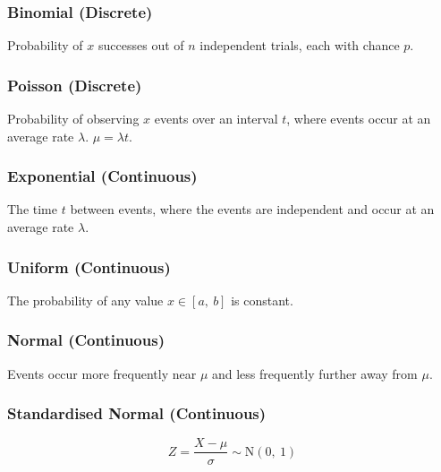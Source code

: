 \documentclass{article}
\begin{document}
\begin{minipage}{62.39259259mm}
    \subsubsection*{Binomial (Discrete)}
    Probability of $x$ successes out of $n$ independent trials, each with chance $p$.
    \subsubsection*{Poisson (Discrete)}
    Probability of observing $x$ events over an interval $t$, where events occur at an
    average rate $\lambda$. $\mu = \lambda t$.
    \subsubsection*{Exponential (Continuous)}
    The time $t$ between events, where the events are independent and occur at an average rate $\lambda$.
    \subsubsection*{Uniform (Continuous)}
    The probability of any value $x\in\left[ a,\: b \right]$ is constant.
    \subsubsection*{Normal (Continuous)}
    Events occur more frequently near $\mu$ and less frequently further away from $\mu$.
    \subsubsection*{Standardised Normal (Continuous)}
    \begin{equation*}
        Z = \frac{X-\mu}{\sigma} \sim \mathrm{N}\left( 0,\: 1 \right)
    \end{equation*}
\end{minipage}
\end{document}
